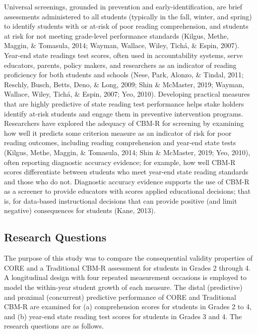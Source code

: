 \documentclass[
  english,
  man, fleqn, noextraspace]{apa6}
\begin{document}
Universal screenings, grounded in prevention and early-identification, are brief assessments administered to all students (typically in the fall, winter, and spring) to identify students with or at-risk of poor reading comprehension, and students at risk for not meeting grade-level performance standards (Kilgus, Methe, Maggin, \& Tomasula, 2014; Wayman, Wallace, Wiley, Tichá, \& Espin, 2007). Year-end state readings test scores, often used in accountability systems, serve educators, parents, policy makers, and researchers as an indicator of reading proficiency for both students and schools (Nese, Park, Alonzo, \& Tindal, 2011; Reschly, Busch, Betts, Deno, \& Long, 2009; Shin \& McMaster, 2019; Wayman, Wallace, Wiley, Tichá, \& Espin, 2007; Yeo, 2010). Developing practical measures that are highly predictive of state reading test performance helps stake holders identify at-risk students and engage them in preventive intervention programs. Researchers have explored the adequacy of CBM-R for screening by examining how well it predicts some criterion measure as an indicator of risk for poor reading outcomes, including reading comprehension and year-end state tests (Kilgus, Methe, Maggin, \& Tomasula, 2014; Shin \& McMaster, 2019; Yeo, 2010), often reporting diagnostic accuracy evidence; for example, how well CBM-R scores differentiate between students who meet year-end state reading standards and those who do not. Diagnostic accuracy evidence supports the use of CBM-R as a screener to provide educators with scores applied educational decisions; that is, for data-based instructional decisions that can provide positive (and limit negative) consequences for students (Kane, 2013).

\hypertarget{research-questions}{%
\subsection{Research Questions}\label{research-questions}}

The purpose of this study was to compare the consequential validity properties of CORE and a Traditional CBM-R assessment for students in Grades 2 through 4. A longitudinal design with four repeated measurement occasions is employed to model the within-year student growth of each measure. The distal (predictive) and proximal (concurrent) predictive performance of CORE and Traditional CBM-R are examined for (a) comprehension scores for students in Grades 2 to 4, and (b) year-end state reading test scores for students in Grades 3 and 4. The research questions are as follows.
\end{document}
